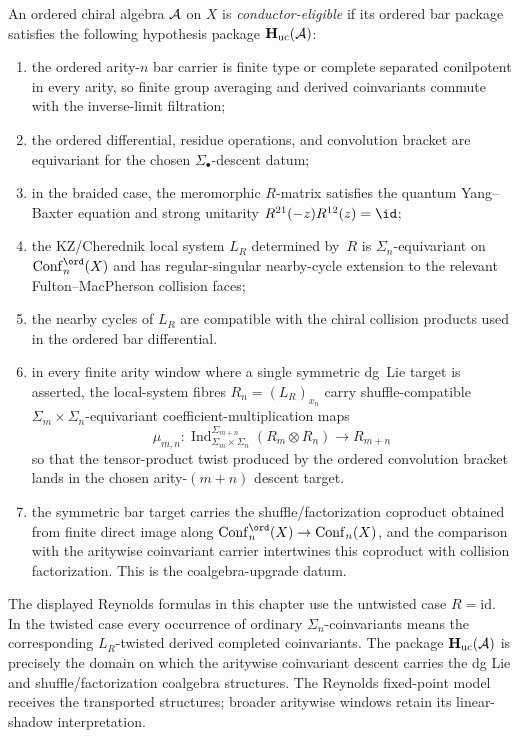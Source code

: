 An ordered chiral algebra $\mathcal{A}$ on $X$ is
\emph{conductor-eligible} if its ordered bar package satisfies the
following hypothesis package
$\mathbf H_{\mathrm{uc}}(\mathcal{A})$:
\begin{enumerate}[label=\textup{(R\arabic*)}]
\item the ordered arity-$n$ bar carrier is finite type or complete
separated conilpotent in every arity, so finite group averaging and
derived coinvariants commute with the inverse-limit filtration;
\item the ordered differential, residue operations, and convolution
bracket are equivariant for the chosen $\Sigma_\bullet$-descent datum;
\item in the braided case, the meromorphic $R$-matrix satisfies the
quantum Yang--Baxter equation and strong unitarity
$R^{21}(-z)R^{12}(z)=\id$;
\item the KZ/Cherednik local system $L_R$ determined by~$R$ is
$\Sigma_n$-equivariant on $\Conf_n^{\ord}(X)$ and has regular-singular
nearby-cycle extension to the relevant Fulton--MacPherson collision
faces;
\item the nearby cycles of $L_R$ are compatible with the chiral
collision products used in the ordered bar differential.
\item in every finite arity window where a single symmetric dg~Lie
target is asserted, the local-system fibres \(R_n=(L_R)_{x_n}\) carry
shuffle-compatible \(\Sigma_m\times\Sigma_n\)-equivariant
coefficient-multiplication maps
\[
\mu_{m,n}\colon
\operatorname{Ind}_{\Sigma_m\times\Sigma_n}^{\Sigma_{m+n}}
(R_m\otimes R_n)\longrightarrow R_{m+n}
\]
so that the tensor-product twist produced by the ordered convolution
bracket lands in the chosen arity-\((m+n)\) descent target.
\item the symmetric bar target carries the shuffle/factorization
coproduct obtained from finite direct image along
$\Conf_n^{\ord}(X)\to\Conf_n(X)$, and the comparison with the
aritywise coinvariant carrier intertwines this coproduct with collision
factorization.  This is the coalgebra-upgrade datum.
\end{enumerate}
The displayed Reynolds formulas in this chapter use the untwisted case
$R=\mathrm{id}$. In the twisted case every occurrence of ordinary
$\Sigma_n$-coinvariants means the corresponding
$L_R$-twisted derived completed coinvariants.  The package
$\mathbf H_{\mathrm{uc}}(\mathcal{A})$ is precisely the domain on which the
aritywise coinvariant descent carries the dg Lie and
shuffle/factorization coalgebra structures.  The Reynolds fixed-point
model receives the transported structures; broader aritywise windows
retain its linear-shadow interpretation.

